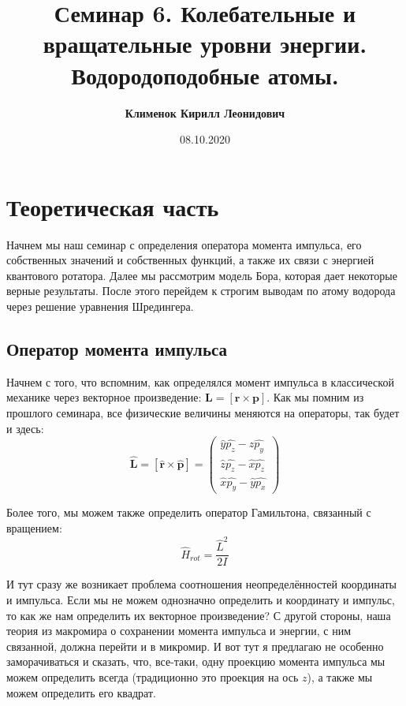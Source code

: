 \documentclass[12pt]{article}
\begin{document}
 
\title{\textbf{Семинар 6. Колебательные и вращательные уровни энергии. Водородоподобные атомы.}}
\author{\textbf{Клименок Кирилл Леонидович}}
\date{08.10.2020}
\maketitle
\section{Теоретическая часть}
Начнем мы наш семинар с определения оператора момента импульса, его собственных значений и собственных функций,  а также их связи с энергией квантового ротатора. Далее мы рассмотрим модель Бора, которая дает некоторые верные результаты. После этого перейдем к строгим выводам по атому водорода через решение уравнения Шредингера. 

\subsection{Оператор момента импульса}
Начнем с того, что вспомним, как определялся момент импульса в классической механике через векторное произведение: $\textbf{L} = [\textbf{r} \times \textbf{p}]$. Как мы помним из прошлого семинара, все физические величины меняются на операторы, так будет и здесь:
\begin{equation}
    \hat{\textbf{L}} = [\hat{\textbf{r}}\times \hat{\textbf{p}}] = \left(\begin{array}{c}
        \hat{y}\hat{p_z} - \hat{z}\hat{p_y}\\
        \hat{z}\hat{p_z} - \hat{x}\hat{p_z}\\
        \hat{x}\hat{p_y} - \hat{y}\hat{p_x} 
    \end{array}\right)
\end{equation}

Более того, мы можем также определить оператор Гамильтона, связанный с вращением:
\begin{equation}
    \hat{H}_{rot} = \dfrac{\hat{L}^2}{2I}
\end{equation}

И тут сразу же возникает проблема соотношения неопределённостей координаты и импульса. Если мы не можем однозначно определить и координату и импульс, то как же нам определить их векторное произведение? С другой стороны, наша теория из макромира о сохранении момента импульса и энергии, с ним связанной, должна перейти и в микромир. И вот тут я предлагаю не особенно заморачиваться и сказать, что, все-таки, одну проекцию момента импульса мы можем определить всегда (традиционно это проекция на ось $z$), а также мы можем определить его квадрат.
\end{document}

